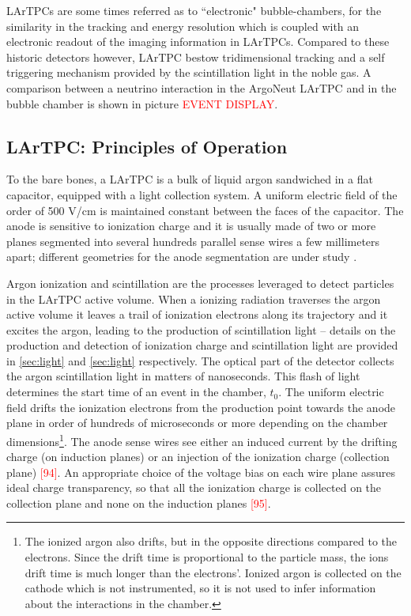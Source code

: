 LArTPCs are some times referred as to ``electronic" bubble-chambers, for the similarity in the tracking and energy resolution which is coupled with an electronic readout of the imaging information in LArTPCs. Compared to these historic detectors however, LArTPC bestow tridimensional tracking and a self triggering mechanism provided by the scintillation light in the noble gas.  A comparison between a neutrino interaction in the ArgoNeut LArTPC and in the bubble chamber is shown in picture \textcolor{red}{EVENT DISPLAY}. 


\subsection{LArTPC: Principles of Operation}\label{sec:LArTPCWorkingPrinciple}


To the bare bones, a LArTPC is a bulk of liquid argon sandwiched in a flat capacitor, equipped with a light collection system. A uniform electric field of the order of 500 V/cm is maintained constant between the faces of the capacitor. The anode is sensitive to ionization charge and it is usually made of two or more planes segmented into several hundreds parallel sense wires a few millimeters apart; different geometries for the anode segmentation are under study \cite{1748-0221-8-07-P07002}. 

Argon ionization and scintillation are the processes leveraged to detect particles in the LArTPC active volume.  When a ionizing radiation traverses the argon active volume it leaves a trail of ionization electrons along its trajectory and it excites the argon, leading to the production of scintillation light -- details on the production and detection of ionization charge and scintillation light are provided in \ref{sec:light} and \ref{sec:light} respectively. The optical part of the detector collects the argon scintillation light in matters of nanoseconds. This flash of light determines the start time of an event in the chamber, $t_0$. The uniform electric field drifts the ionization  electrons from the production point towards the anode plane in order of hundreds of microseconds or more depending on the chamber dimensions\footnote{The ionized argon also drifts, but  in the opposite directions compared to the electrons. Since the drift time is proportional to the particle mass,  the ions drift time is much longer than the electrons'.  Ionized argon is collected on the cathode which is not instrumented, so it is not used to infer information about the interactions in the chamber.}. The anode sense wires see either an induced current by the drifting charge (on induction planes) or an injection of the ionization charge (collection plane) \textcolor{red}{[94]}.    An appropriate choice of the voltage bias on each wire plane assures ideal charge transparency, so that all the ionization charge is collected on the collection plane and none on the induction planes \textcolor{red}{[95]}.  

